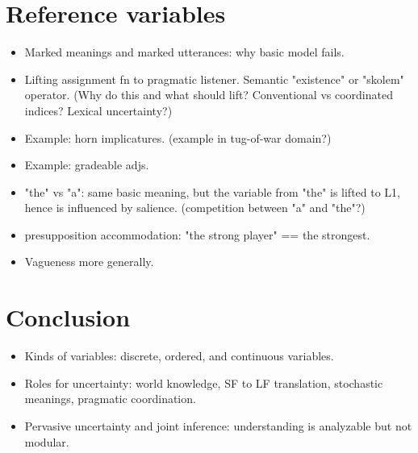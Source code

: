 \documentclass[12pt]{article}
\begin{document}
\section{Reference variables}
\begin{itemize}
\item   Marked meanings and marked utterances: why basic model fails.
\item  Lifting assignment fn to pragmatic listener. Semantic "existence" or "skolem" operator.  (Why do this and what should lift? Conventional vs coordinated indices? Lexical uncertainty?)
\item  Example: horn implicatures. (example in tug-of-war domain?)
\item  Example: gradeable adjs.
\item  "the" vs "a": same basic meaning, but the variable from "the" is lifted to L1, hence is influenced by salience. (competition between "a" and "the"?)
\item  presupposition accommodation: "the strong player" == the strongest.
\item  Vagueness more generally.
\end{itemize}



\section{Conclusion}
\begin{itemize}
\item  Kinds of variables: discrete, ordered, and continuous variables.
\item  Roles for uncertainty: world knowledge, SF to LF translation, stochastic meanings, pragmatic coordination.
\item  Pervasive uncertainty and joint inference: understanding is analyzable but not modular.
\end{itemize}
\end{document}
